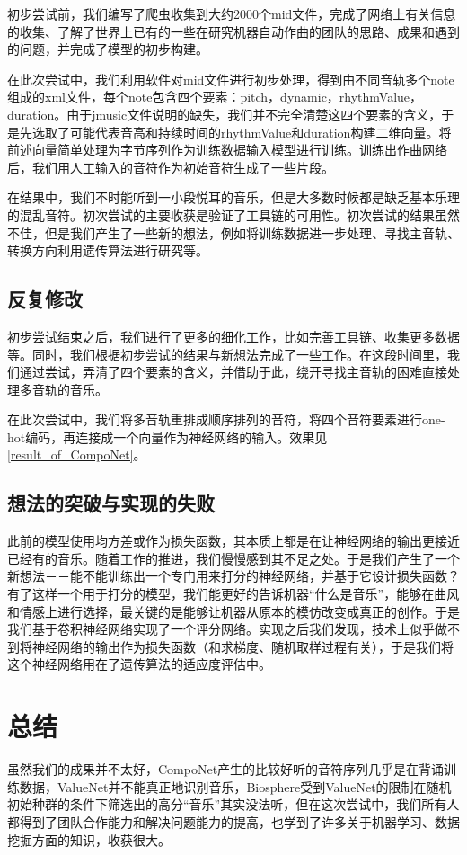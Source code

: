 \documentclass{article}
\begin{document}
    初步尝试前，我们编写了爬虫收集到大约2000个mid文件，完成了网络上有关信息的收集、了解了世界上已有的一些在研究机器自动作曲的团队的思路、成果和遇到的问题，并完成了模型的初步构建。

    在此次尝试中，我们利用软件\cite{jmusic}对mid文件进行初步处理，得到由不同音轨多个note组成的xml文件，每个note包含四个要素：pitch，dynamic，rhythmValue，duration。由于jmusic文件说明的缺失，我们并不完全清楚这四个要素的含义，于是先选取了可能代表音高和持续时间的rhythmValue和duration构建二维向量。将前述向量简单处理为字节序列作为训练数据输入模型进行训练。训练出作曲网络后，我们用人工输入的音符作为初始音符生成了一些片段。

    在结果中，我们不时能听到一小段悦耳的音乐，但是大多数时候都是缺乏基本乐理的混乱音符。初次尝试的主要收获是验证了工具链的可用性。初次尝试的结果虽然不佳，但是我们产生了一些新的想法，例如将训练数据进一步处理、寻找主音轨、转换方向利用遗传算法进行研究等。
    \subsection{反复修改}
    初步尝试结束之后，我们进行了更多的细化工作，比如完善工具链、收集更多数据等。同时，我们根据初步尝试的结果与新想法完成了一些工作。在这段时间里，我们通过尝试，弄清了四个要素的含义，并借助于此，绕开寻找主音轨的困难直接处理多音轨的音乐。

    在此次尝试中，我们将多音轨重排成顺序排列的音符，将四个音符要素进行one-hot编码，再连接成一个向量作为神经网络的输入。效果见\ref{result_of_CompoNet}。
    \subsection{想法的突破与实现的失败}
    此前的模型使用均方差或\cite{交叉熵}作为损失函数，其本质上都是在让神经网络的输出更接近已经有的音乐。随着工作的推进，我们慢慢感到其不足之处。于是我们产生了一个新想法－－能不能训练出一个专门用来打分的神经网络，并基于它设计损失函数？有了这样一个用于打分的模型，我们能更好的告诉机器“什么是音乐”，能够在曲风和情感上进行选择，最关键的是能够让机器从原本的模仿改变成真正的创作。于是我们基于卷积神经网络实现了一个评分网络。实现之后我们发现，技术上似乎做不到将神经网络的输出作为损失函数（和求梯度、随机取样过程有关），于是我们将这个神经网络用在了遗传算法的适应度评估中。







\section{总结}
虽然我们的成果并不太好，CompoNet产生的比较好听的音符序列几乎是在背诵训练数据，ValueNet并不能真正地识别音乐，Biosphere受到ValueNet的限制在随机初始种群的条件下筛选出的高分“音乐”其实没法听，但在这次尝试中，我们所有人都得到了团队合作能力和解决问题能力的提高，也学到了许多关于机器学习、数据挖掘方面的知识，收获很大。
\end{document}
